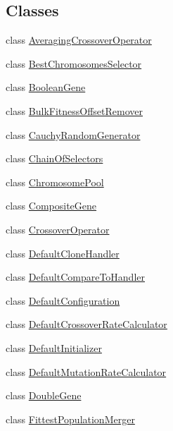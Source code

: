 \subsection*{Classes}
\begin{DoxyCompactItemize}
\item 
class \hyperlink{classorg_1_1jgap_1_1impl_1_1_averaging_crossover_operator}{Averaging\-Crossover\-Operator}
\item 
class \hyperlink{classorg_1_1jgap_1_1impl_1_1_best_chromosomes_selector}{Best\-Chromosomes\-Selector}
\item 
class \hyperlink{classorg_1_1jgap_1_1impl_1_1_boolean_gene}{Boolean\-Gene}
\item 
class \hyperlink{classorg_1_1jgap_1_1impl_1_1_bulk_fitness_offset_remover}{Bulk\-Fitness\-Offset\-Remover}
\item 
class \hyperlink{classorg_1_1jgap_1_1impl_1_1_cauchy_random_generator}{Cauchy\-Random\-Generator}
\item 
class \hyperlink{classorg_1_1jgap_1_1impl_1_1_chain_of_selectors}{Chain\-Of\-Selectors}
\item 
class \hyperlink{classorg_1_1jgap_1_1impl_1_1_chromosome_pool}{Chromosome\-Pool}
\item 
class \hyperlink{classorg_1_1jgap_1_1impl_1_1_composite_gene}{Composite\-Gene}
\item 
class \hyperlink{classorg_1_1jgap_1_1impl_1_1_crossover_operator}{Crossover\-Operator}
\item 
class \hyperlink{classorg_1_1jgap_1_1impl_1_1_default_clone_handler}{Default\-Clone\-Handler}
\item 
class \hyperlink{classorg_1_1jgap_1_1impl_1_1_default_compare_to_handler}{Default\-Compare\-To\-Handler}
\item 
class \hyperlink{classorg_1_1jgap_1_1impl_1_1_default_configuration}{Default\-Configuration}
\item 
class \hyperlink{classorg_1_1jgap_1_1impl_1_1_default_crossover_rate_calculator}{Default\-Crossover\-Rate\-Calculator}
\item 
class \hyperlink{classorg_1_1jgap_1_1impl_1_1_default_initializer}{Default\-Initializer}
\item 
class \hyperlink{classorg_1_1jgap_1_1impl_1_1_default_mutation_rate_calculator}{Default\-Mutation\-Rate\-Calculator}
\item 
class \hyperlink{classorg_1_1jgap_1_1impl_1_1_double_gene}{Double\-Gene}
\item 
class \hyperlink{classorg_1_1jgap_1_1impl_1_1_fittest_population_merger}{Fittest\-Population\-Merger}

\end{DoxyCompactItemize}
